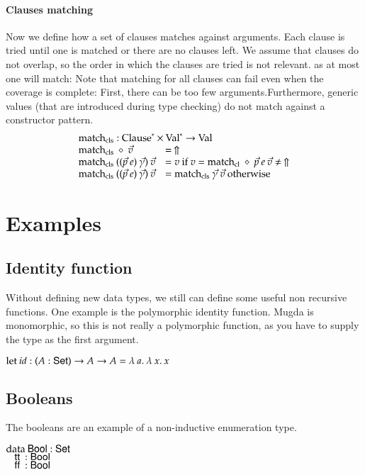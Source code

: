 \paragraph*{Clauses matching} 
Now we define how a set of clauses matches against arguments. 
Each clause is tried until one is matched or there are no clauses left. We assume that clauses do not overlap, so the order in which the clauses are tried is not relevant. as at most one will match:
Note that matching for all clauses can fail even when the coverage is complete: First, there can be too few arguments.Furthermore, generic values (that are introduced during type checking) do not match against a constructor pattern. 
\[
\begin{array}{ll}
\multicolumn{2}{l}{\matchcls : \ves{\Clause} \times \ves{\Val} \ra \Val}\\
\matchcls \: \diamond \: \vec{v} & = \stuck \\
\matchcls \:  ((\vec{p} \: e)\:\vec{\gamma}) \: \vec{v} & = v \mbox{ if } v = \matchcl \: \diamond \: \vec{p} \: e \:  \vec{v} \neq \stuck \\
\matchcls \: ((\vec{p} \: e)\:\vec{\gamma}) \: \vec{v} & = \matchcls \: \vec{\gamma} \: \vec{v} \mbox{ otherwise}  
\end{array}
\]


\section{Examples}
\subsection{Identity function}
Without defining new data types, we still can define some useful non recursive functions.
One example is the polymorphic identity function. 
Mugda is monomorphic, so this is not really a polymorphic function, as you have to supply the
type as the first argument.
\begin{bsp}
$\mathrm{let}\: id : ( A : \mathsf{Set} ) \rightarrow{A \rightarrow A} = \lambda\: a .\:\lambda\: x .\:x$   
\end{bsp}

\subsection{Booleans}
The booleans are an example of a non-inductive enumeration type.
\begin{bsp}
$\mathrm{data}\: \mathsf{Bool} : \mathsf{Set}$  \\
$\hspace*{3mm} \mathsf{tt}\: : \mathsf{Bool} $\\
$\hspace*{3mm} \mathsf{ff}\: : \mathsf{Bool} $
\end{bsp}

